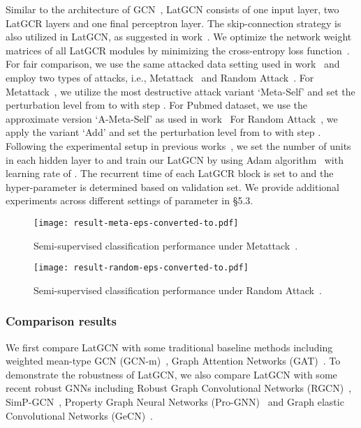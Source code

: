 \documentclass{article}
\begin{document}
Similar to the architecture of GCN~\cite{kipf2016semi}, LatGCN consists of one input layer, two LatGCR layers and one final  perceptron layer. The skip-connection strategy is also utilized in LatGCN, as suggested in work~\cite{kipf2016semi,7780459}.
We optimize the network weight matrices of all LatGCR modules by minimizing the cross-entropy loss function~\cite{kipf2016semi}.
For fair comparison,
we use the same attacked data setting used in work~\cite{prognn} and employ two types of attacks, i.e., Metattack~\cite{mettack} and Random Attack~\cite{jin2020adversarial}.
For Metattack~\cite{mettack},  we utilize the most destructive attack variant `Meta-Self' and
set the perturbation level from  to  with step .
For Pubmed dataset, we use the approximate version `A-Meta-Self'  as used in work~\cite{prognn}
For Random Attack~\cite{jin2020adversarial},  we apply the variant `Add' and
set the perturbation level from  to  with step .
Following the experimental setup in previous works~\cite{kipf2016semi,velickovic2017graph},
we set the number of units in each hidden layer to 
and train our LatGCN by using Adam algorithm~\cite{Adam} with learning rate of .
The recurrent time of each LatGCR block is set to  and the hyper-parameter  is determined based on validation set.
We provide additional experiments across different settings of parameter  in \S 5.3.
\begin{figure*}[ht]
\centering
\texttt{[image: result-meta-eps-converted-to.pdf]}
  \caption{Semi-supervised classification performance under Metattack~\cite{mettack}.}
\label{fig:result-semi-noise-meta}
\end{figure*}
\begin{figure*}[ht]
\centering
\texttt{[image: result-random-eps-converted-to.pdf]}
  \caption{Semi-supervised  classification performance under Random Attack~\cite{jin2020adversarial}.}
\label{fig:result-semi-noise-random}
\end{figure*}
\subsubsection{Comparison results}


We first compare LatGCN with some traditional baseline methods including weighted mean-type GCN (GCN-m)~\cite{kipf2016semi,graphsage}, Graph Attention Networks (GAT)~\cite{velickovic2017graph}.
To demonstrate the robustness of LatGCN,
we also compare LatGCN with some recent robust GNNs including Robust Graph Convolutional Networks (RGCN)~\cite{RGCN}, SimP-GCN~\cite{SimPGCN}, Property Graph Neural Networks (Pro-GNN)~\cite{prognn} and Graph elastic Convolutional Networks (GeCN)~\cite{GECN}.
\end{document}
